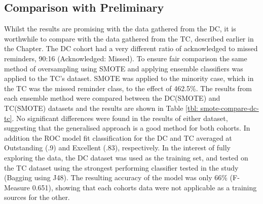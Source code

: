 \subsection{Comparison with Preliminary}
Whilst the results are promising with the data gathered from the DC, it is worthwhile to compare with the data gathered from the TC, described earlier in the Chapter. The DC cohort had a very different ratio of acknowledged to missed reminders, 90:16 (Acknowledged: Missed). To ensure fair comparison the same method of oversampling using SMOTE and applying ensemble classifiers was applied to the TC's dataset. SMOTE was applied to the minority case, which in the TC was the missed reminder class, to the effect of 462.5\%. The results from each ensemble method were compared between the DC(SMOTE) and TC(SMOTE) datasets and the results are shown in Table \ref{tbl: smote-compare-dc-tc}. No significant differences were found in the results of either dataset, suggesting that the generalised approach is a good method for both cohorts. In addition the ROC model fit classification for the DC and TC averaged at Outstanding (.9) and Excellent (.83), respectively. In the interest of fully exploring the data, the DC dataset was used as the training set, and tested on the TC dataset using the strongest performing classifier tested in the study (Bagging using J48). The resulting accuracy of the model was only 66\% (F-Measure 0.651), showing that each cohorts data were not applicable as a training sources for the other.


